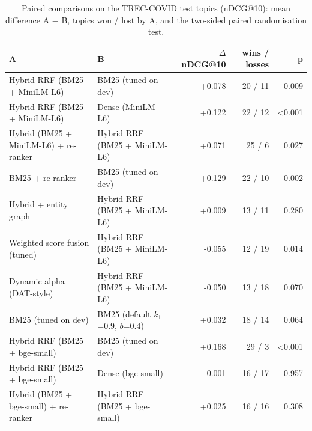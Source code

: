 \begin{table}[t]
\centering\small
\begin{tabular}{llrrr}
\toprule
A & B & $\Delta$ nDCG@10 & wins / losses & p \\
\midrule
Hybrid RRF (BM25 + MiniLM-L6) & BM25 (tuned on dev) & +0.078 & 20 / 11 & 0.009 \\
Hybrid RRF (BM25 + MiniLM-L6) & Dense (MiniLM-L6) & +0.122 & 22 / 12 & <0.001 \\
Hybrid (BM25 + MiniLM-L6) + re-ranker & Hybrid RRF (BM25 + MiniLM-L6) & +0.071 & 25 / 6 & 0.027 \\
BM25 + re-ranker & BM25 (tuned on dev) & +0.129 & 22 / 10 & 0.002 \\
Hybrid + entity graph & Hybrid RRF (BM25 + MiniLM-L6) & +0.009 & 13 / 11 & 0.280 \\
Weighted score fusion (tuned) & Hybrid RRF (BM25 + MiniLM-L6) & -0.055 & 12 / 19 & 0.014 \\
Dynamic alpha (DAT-style) & Hybrid RRF (BM25 + MiniLM-L6) & -0.050 & 13 / 18 & 0.070 \\
BM25 (tuned on dev) & BM25 (default $k_1$=0.9, $b$=0.4) & +0.032 & 18 / 14 & 0.064 \\
Hybrid RRF (BM25 + bge-small) & BM25 (tuned on dev) & +0.168 & 29 / 3 & <0.001 \\
Hybrid RRF (BM25 + bge-small) & Dense (bge-small) & -0.001 & 16 / 17 & 0.957 \\
Hybrid (BM25 + bge-small) + re-ranker & Hybrid RRF (BM25 + bge-small) & +0.025 & 16 / 16 & 0.308 \\
\bottomrule
\end{tabular}
\caption{Paired comparisons on the TREC-COVID test topics (nDCG@10): mean difference A $-$ B, topics won / lost by A, and the two-sided paired randomisation test.}
\label{tab:retrieval_tests}
\end{table}

